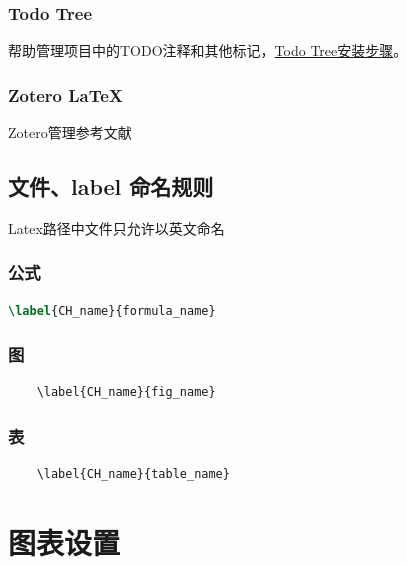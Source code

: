 \documentclass[engineeringmaster]{hquThesis}
\begin{document}
\subsection*{Todo Tree}
帮助管理项目中的TODO注释和其他标记，\href{https://blog.csdn.net/m0_37586991/article/details/104239568}{Todo Tree安装步骤}。

\subsection*{Zotero LaTeX}
Zotero管理参考文献
\section{文件、label 命名规则}
Latex路径中文件只允许以英文命名

\subsection*{公式}
\begin{lstlisting}[language=TeX]
    \label{CH_name}{formula_name}
\end{lstlisting}

\subsection*{图}
\begin{lstlisting}
    \label{CH_name}{fig_name}
\end{lstlisting}

\subsection*{表}
\begin{lstlisting}
    \label{CH_name}{table_name}
\end{lstlisting}


\chapter{图表设置}
\end{document}
